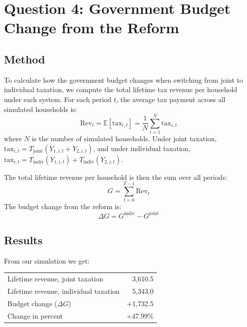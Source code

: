 \section{Question 4: Government Budget Change from the Reform}

\subsection*{Method}

To calculate how the government budget changes when switching from joint to individual taxation, we compute the total lifetime tax revenue per household under each system. For each period $t$, the average tax payment across all simulated households is:
%
\begin{equation}
    \text{Rev}_t = \mathbb{E}\left[\text{tax}_{i,t}\right] = \frac{1}{N} \sum_{i=1}^{N} \text{tax}_{i,t}
\end{equation}
%
where $N$ is the number of simulated households. Under joint taxation, $\text{tax}_{i,t} = T_{\text{joint}}(Y_{1,i,t} + Y_{2,i,t})$, and under individual taxation, $\text{tax}_{i,t} = T_{\text{indiv}}(Y_{1,i,t}) + T_{\text{indiv}}(Y_{2,i,t})$.

The total lifetime revenue per household is then the sum over all periods:
%
\begin{equation}
    G = \sum_{t=0}^{T-1} \text{Rev}_t
\end{equation}
%
The budget change from the reform is:
%
\begin{equation}
    \Delta G = G^{\text{indiv}} - G^{\text{joint}}
\end{equation}

\subsection*{Results}

From our simulation we get:

\begin{center}
\begin{tabular}{l r}
\hline
Lifetime revenue, joint taxation      & 3{,}610.5 \\
Lifetime revenue, individual taxation & 5{,}343.0 \\
\hline
Budget change ($\Delta G$)            & $+$1{,}732.5 \\
Change in percent                     & $+$47.99\% \\
\hline
\end{tabular}
\end{center}


